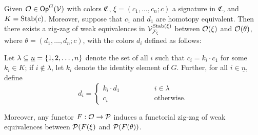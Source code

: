 \documentclass[a4paper,10pt
,draft
]{article}%
\renewcommand{\F}{\mathcal F}
\renewcommand{\1}{\ensuremath{\mathbb{id}}}
\begin{document}
\begin{proposition}
      \label{CAV_4.14_PROP}
      Given $\O \in \Op^G(\V)$ with colors $\C$, $\xi = (c_1,\dots,c_n;c)$ a signature in $\C$, and $K = \Stab(c)$.
      Moreover, suppose that $c_1$ and $d_1$ are homotopy equivalent.
      Then there exists a zig-zag of weak equivalences in $\V^{\Stab(\xi)}_{\F_\xi}$ between
      $\O(\xi)$ and $\O(\theta)$, where
      $\theta = (d_1,\ldots, d_n; c)$, with the colors $d_i$ defined as follows:
      
      Let $\lambda \subseteq \underline{n} = \set{1,2,\ldots, n}$ denote
      the set of all $i$ such that $c_i = k_i \cdot c_1$ for some $k_i\in K$;
      if $i \notin \lambda$, let $k_i$ denote the identity element of $G$.
      Further, for all $i \in \underline{n}$, define
      \begin{equation}
            \label{DCOLORS_EQ}
            d_i =
            \begin{cases}
                  k_i \cdot d_1 \qquad \qquad & i \in \lambda
                  \\
                  c_i & \mbox{otherwise.}
            \end{cases}
      \end{equation}

      Moreover, any functor $F: \O \to \P$ induces a functorial zig-zag of weak equivalences between
      $\P(F(\xi)$ and $\P(F(\theta))$.
\end{proposition}
\end{document}
